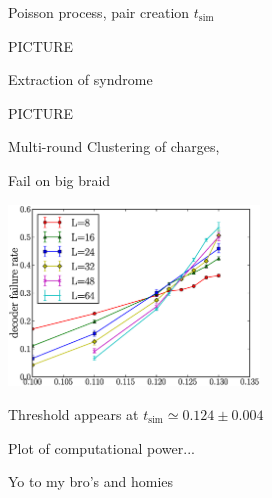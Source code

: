\documentclass[12pt,a4paper]{article}
\begin{document}


Poisson process, pair creation $t_{\mathrm{sim}}$

PICTURE

Extraction of syndrome

PICTURE

Multi-round
Clustering of charges, \cite{Brell13} \cite{Bravyi13}

Fail on big braid



\begin{center}
\includegraphics[width=0.5\textwidth]{threshold-graph.eps}
\end{center}

Threshold appears at $t_{\mathrm{sim}}\simeq 0.124 \pm 0.004$

Plot of computational power...





Yo to my bro's and homies


%
\end{document}
